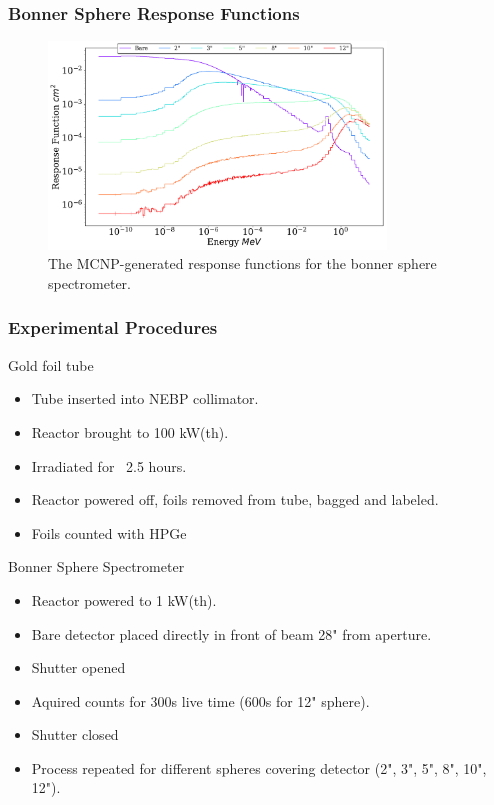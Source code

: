 \documentclass[fleqn]{beamer}
\begin{document}
\begin{frame}
\frametitle{Bonner Sphere Response Functions}

\begin{figure}
\centering
\includegraphics[width = 0.8\textwidth]{bs}
\caption{The MCNP-generated response functions for the bonner sphere spectrometer.}
\end{figure}

\end{frame}

\begin{frame}
\frametitle{Experimental Procedures}

Gold foil tube
\begin{itemize}
\item Tube inserted into NEBP collimator.
\item Reactor brought to 100 kW(th).
\item Irradiated for ~2.5 hours.
\item Reactor powered off, foils removed from tube, bagged and labeled.
\item Foils counted with HPGe
\end{itemize}

Bonner Sphere Spectrometer
\begin{itemize}
\item Reactor powered to 1 kW(th).
\item Bare detector placed directly in front of beam 28" from aperture.
\item Shutter opened
\item Aquired counts for 300s live time (600s for 12" sphere).
\item Shutter closed
\item Process repeated for different spheres covering detector (2", 3", 5", 8", 10", 12").
\end{itemize}
\end{frame}
\end{document}
